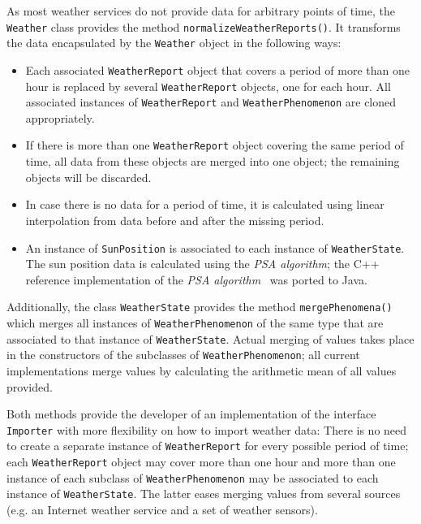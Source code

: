 As most weather services do not provide data for arbitrary points of time, the \texttt{Weather} class provides the method \texttt{normalizeWeatherReports()}. It transforms the data encapsulated by the \texttt{Weather} object in the following ways:
\begin{itemize}
  \item Each associated \texttt{WeatherReport} object that covers a period of more than one hour is replaced by several \texttt{WeatherReport} objects, one for each hour. All associated instances of \texttt{WeatherReport} and \texttt{WeatherPhenomenon} are cloned appropriately.
  
  \item If there is more than one \texttt{WeatherReport} object covering the same period of time, all data from these objects are merged into one object; the remaining objects will be discarded.
  
  \item In case there is no data for a period of time, it is calculated using linear interpolation from data before and after the missing period\cite{maths}.
  
  \item An instance of \texttt{SunPosition} is associated to each instance of \texttt{WeatherState}. The sun position data is calculated using the \emph{PSA algorithm}\cite{PSA_algorithm}; the C++ reference implementation of the \emph{PSA algorithm}~\cite{psa_online} was ported to Java.
\end{itemize}

Additionally, the class \texttt{WeatherState} provides the method \texttt{mergePhenomena()} which merges all instances of \texttt{WeatherPhenomenon} of the same type that are associated to that instance of \texttt{WeatherState}. Actual merging of values takes place in the constructors of the subclasses of \texttt{WeatherPhenomenon}; all current implementations merge values by calculating the arithmetic mean of all values provided\cite{maths}.

Both methods provide the developer of an implementation of the interface \texttt{Importer} with more flexibility on how to import weather data: There is no need to create a separate instance of \texttt{WeatherReport} for every possible period of time; each \texttt{WeatherReport} object may cover more than one hour and more than one instance of each subclass of \texttt{WeatherPhenomenon} may be associated to each instance of \texttt{WeatherState}. The latter eases merging values from several sources (e.g. an Internet weather service and a set of weather sensors).

